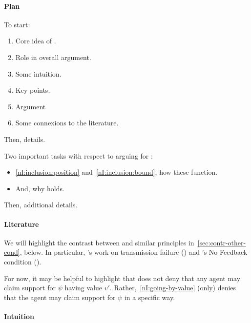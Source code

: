\paragraph{Plan}

\begin{note}[Plan]
  To start:
  \begin{enumerate}
  \item Core idea of \nI{}.
  \item Role in overall argument.
  \item Some intuition.
  \item Key points.
  \item Argument
  \item Some connexions to the literature.
  \end{enumerate}
  Then, details.
\end{note}

\begin{note}[Task]
  Two important tasks with respect to arguing for \nI{}:

  \begin{itemize}
  \item \ref{nI:inclusion:position} and~\ref{nI:inclusion:bound}, how these function.
  \item And, why \nI{} holds.
  \end{itemize}

  Then, additional details.
\end{note}

\paragraph{Literature}

\begin{note}[Literature]
  We will highlight the contrast between \nI{} and similar principles in~\autoref{sec:contr-other-cond}, below.
  In particular, \citeauthor{Wright:2011wn}'s work on transmission failure (\Citeyear{Wright:2003aa,Wright:2011wn}) and \citeauthor{Weisberg:2010to}'s No Feedback condition (\Citeyear{Weisberg:2010to}).

  For now, it may be helpful to highlight that \nI{} does not deny that any agent may claim support for \(\psi\) having value \(v'\).
  Rather,~\ref{nI:going-by-value} (only) denies that the agent may claim support for \(\psi\) in a specific way.
\end{note}

\paragraph{Intuition}

